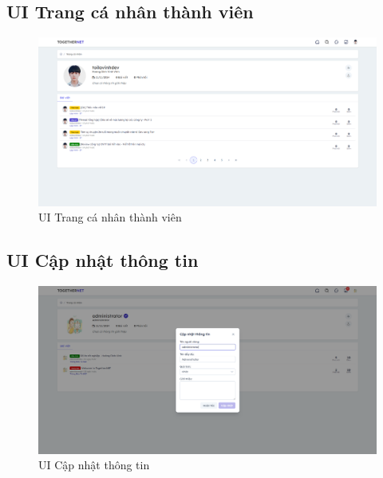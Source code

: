 \documentclass[../index.tex]{subfiles}
\begin{document}
    \subsection{UI Trang cá nhân thành viên}
    \begin{figure}[H]
        \centering
        \includegraphics[width=1\linewidth]{figures/demo/profile-page.png}
        \caption{UI Trang cá nhân thành viên}
    \end{figure}

    \subsection{UI Cập nhật thông tin}
    \begin{figure}[H]
        \centering
        \includegraphics[width=1\linewidth]{
            figures/demo/update-profile-page.png
        }
        \caption{UI Cập nhật thông tin}
    \end{figure}
\end{document}
